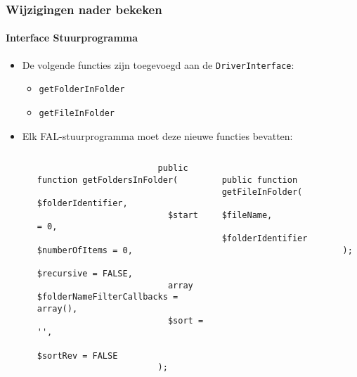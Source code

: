 \begin{frame}[fragile]
	\frametitle{Wijzigingen nader bekeken}
	\framesubtitle{Interface Stuurprogramma}

	\lstset{basicstyle=\tiny\ttfamily}

	\begin{itemize}

		\item De volgende functies zijn toegevoegd aan de \texttt{DriverInterface}:

			\begin{itemize}
				\item \texttt{getFolderInFolder}
				\item \texttt{getFileInFolder}
			\end{itemize}

		\item Elk FAL-stuurprogramma moet deze nieuwe functies bevatten:

			\begin{columns}[T]
				\begin{column}{.07\textwidth}
                \end{column}
				\begin{column}{.465\textwidth}

					\begin{lstlisting}
						public function getFoldersInFolder(
						  $folderIdentifier,
						  $start = 0,
						  $numberOfItems = 0,
						  $recursive = FALSE,
						  array $folderNameFilterCallbacks = array(),
						  $sort = '',
						  $sortRev = FALSE
						);
					\end{lstlisting}

                \end{column}
				\begin{column}{.465\textwidth}

					\begin{lstlisting}
						public function getFileInFolder(
						  $fileName,
						  $folderIdentifier
						);
					\end{lstlisting}

				\end{column}
			\end{columns}

	\end{itemize}

	\breakingchange

\end{frame}

